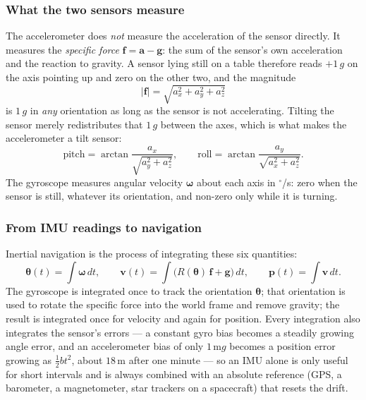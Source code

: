 \documentclass[10pt,a4paper]{article}
\begin{document}
\subsubsection{What the two sensors measure}
The accelerometer does \emph{not} measure the acceleration of the sensor directly. It
measures the \emph{specific force} $\mathbf{f} = \mathbf{a} - \mathbf{g}$: the sum of
the sensor's own acceleration and the reaction to gravity. A sensor lying still on a
table therefore reads $+1\,g$ on the axis pointing up and zero on the other two, and
the magnitude
\[
  |\mathbf{f}| = \sqrt{a_x^2 + a_y^2 + a_z^2}
\]
is $1\,g$ in \emph{any} orientation as long as the sensor is not accelerating. Tilting
the sensor merely redistributes that $1\,g$ between the axes, which is what makes the
accelerometer a tilt sensor:
\[
  \text{pitch} = \arctan\frac{a_x}{\sqrt{a_y^2 + a_z^2}},\qquad
  \text{roll}  = \arctan\frac{a_y}{\sqrt{a_x^2 + a_z^2}} .
\]
The gyroscope measures angular velocity $\boldsymbol{\omega}$ about each axis in
$^{\circ}$/s: zero when the sensor is still, whatever its orientation, and non-zero only
while it is turning.

\subsubsection{From IMU readings to navigation}
Inertial navigation is the process of integrating these six quantities:
\[
  \boldsymbol{\theta}(t) = \int \boldsymbol{\omega}\,dt,\qquad
  \mathbf{v}(t) = \int \bigl(R(\boldsymbol{\theta})\,\mathbf{f} + \mathbf{g}\bigr)\,dt,\qquad
  \mathbf{p}(t) = \int \mathbf{v}\,dt .
\]
The gyroscope is integrated once to track the orientation $\boldsymbol{\theta}$; that
orientation is used to rotate the specific force into the world frame and remove
gravity; the result is integrated once for velocity and again for position. Every
integration also integrates the sensor's errors --- a constant gyro bias becomes a
steadily growing angle error, and an accelerometer bias of only $1\,\mathrm{m}g$ becomes
a position error growing as $\tfrac12 b t^2$, about $18\,\mathrm{m}$ after one minute
--- so an IMU alone is only useful for short intervals and is always combined with an
absolute reference (GPS, a barometer, a magnetometer, star trackers on a spacecraft)
that resets the drift.
\end{document}
